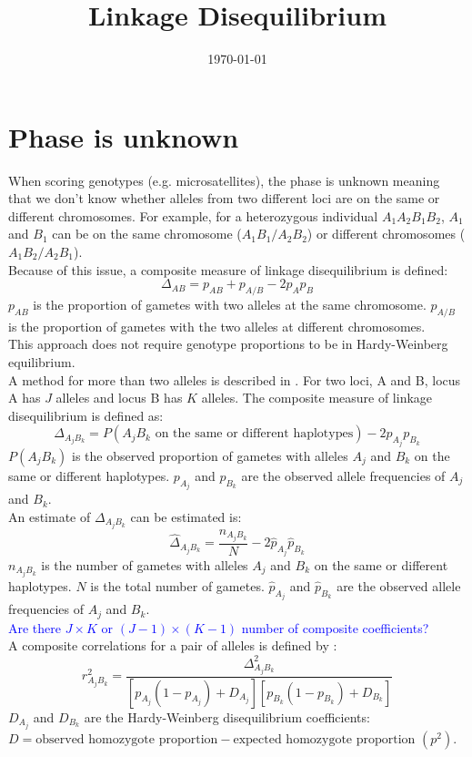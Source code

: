 \documentclass[12pt]{article}
\title{Linkage Disequilibrium}
\date{\today}
\begin{document}
\maketitle

\section{Phase is unknown}
When scoring genotypes (e.g. microsatellites), the phase is unknown meaning that we don't know whether alleles from two different loci are on the same or different chromosomes. For example, for a heterozygous individual $A_1A_2B_1B_2$, $A_1$ and $B_1$ can be on the same chromosome ($A_1B_1/A_2B_2$) or different chromosomes ($A_1B_2/A_2B_1$). \\

Because of this issue, a composite measure of linkage disequilibrium is defined: 
$$\Delta_{AB} = p_{AB} + p_{A/B} - 2p_Ap_B$$
$p_{AB}$ is the proportion of gametes with two alleles at the same chromosome. $p_{A/B}$ is the proportion of gametes with the two alleles at different chromosomes. \\

This approach does not require genotype proportions to be in Hardy-Weinberg equilibrium. \\

A method for more than two alleles is described in \cite{Schaid2004}. For two loci, A and B, locus A has $J$ alleles and locus B has $K$ alleles. The composite measure of linkage disequilibrium is defined as:
$$\Delta_{A_jB_k} = P(A_jB_k \text{ on the same or different haplotypes}) - 2p_{A_j}p_{B_k}$$
$P(A_jB_k)$ is the observed proportion of gametes with alleles $A_j$ and $B_k$ on the same or different haplotypes. $p_{A_j}$ and $p_{B_k}$ are the observed allele frequencies of $A_j$ and $B_k$. \\

An estimate of $\Delta_{A_jB_k}$ can be estimated is:
$$\hat{\Delta}_{A_jB_k} = \frac{n_{A_jB_k}}{N} - 2\hat{p}_{A_j}\hat{p}_{B_k}$$
$n_{A_jB_k}$ is the number of gametes with alleles $A_j$ and $B_k$ on the same or different haplotypes. $N$ is the total number of gametes. $\hat{p}_{A_j}$ and $\hat{p}_{B_k}$ are the observed allele frequencies of $A_j$ and $B_k$. \\

\textcolor{blue}{Are there $J \times K$ or $(J-1)\times(K-1)$ number of composite coefficients?} \\

A composite correlations for a pair of alleles is defined by \cite{Zaykin2008}:
$$r_{A_jB_k}^2 = \frac{\Delta_{A_jB_k}^2}{[p_{A_j}(1-p_{A_j})+D_{A_j}][p_{B_k}(1-p_{B_k})+D_{B_k}]}$$
$D_{A_j}$ and $D_{B_k}$ are the Hardy-Weinberg disequilibrium coefficients: $D = \text{observed homozygote proportion} - \text{expected homozygote proportion }(p^2)$. \\
\end{document}
